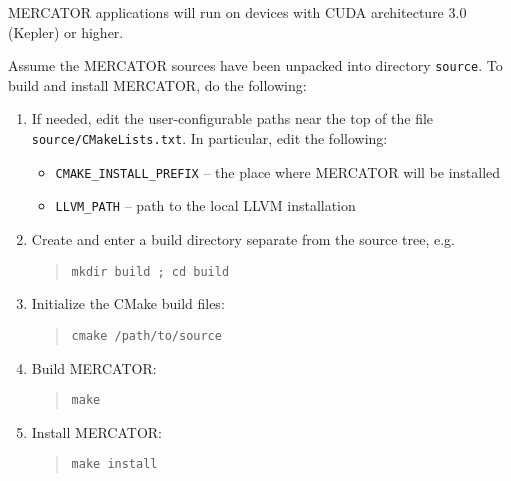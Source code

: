 \documentclass[11pt]{article}
\begin{document}
MERCATOR applications will run on devices with CUDA architecture 3.0
(Kepler) or higher.

Assume the MERCATOR sources have been unpacked into directory \texttt{source}.
To build and install MERCATOR, do the following:
\begin{enumerate}

\item If needed, edit the user-configurable paths near the top of the file
      \texttt{source/CMakeLists.txt}.  In particular, edit the following:
 \begin{itemize}
   \item \texttt{CMAKE_INSTALL_PREFIX} -- the place where MERCATOR will be
          installed
   \item \texttt{LLVM_PATH} -- path to the local LLVM installation
 \end{itemize}

\item Create and enter a build directory separate from the source tree, e.g.
\begin{quote}
\texttt{mkdir build ; cd build}
\end{quote}

\item Initialize the CMake build files:
\begin{quote}
\texttt{cmake /path/to/source}
\end{quote}

\item Build MERCATOR:
\begin{quote}
\texttt{make}
\end{quote}

\item Install MERCATOR:
\begin{quote}
\texttt{make install}
\end{quote}

\end{enumerate}
\end{document}
